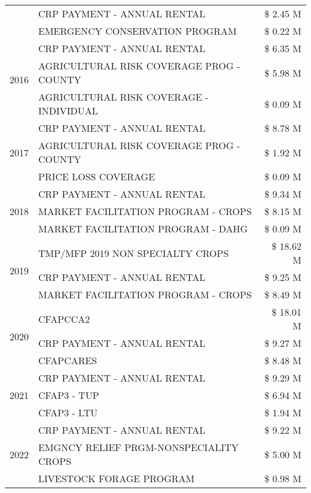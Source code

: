 \begin{tabular}{llr}
 & CRP PAYMENT - ANNUAL RENTAL & \$ 2.45 M \\
 & EMERGENCY CONSERVATION PROGRAM & \$ 0.22 M \\
\cline{1-3}
\multirow[t]{3}{*}{2016} & CRP PAYMENT - ANNUAL RENTAL & \$ 6.35 M \\
 & AGRICULTURAL RISK COVERAGE PROG - COUNTY & \$ 5.98 M \\
 & AGRICULTURAL RISK COVERAGE - INDIVIDUAL & \$ 0.09 M \\
\cline{1-3}
\multirow[t]{3}{*}{2017} & CRP PAYMENT - ANNUAL RENTAL & \$ 8.78 M \\
 & AGRICULTURAL RISK COVERAGE PROG - COUNTY & \$ 1.92 M \\
 & PRICE LOSS COVERAGE & \$ 0.09 M \\
\cline{1-3}
\multirow[t]{3}{*}{2018} & CRP PAYMENT - ANNUAL RENTAL & \$ 9.34 M \\
 & MARKET FACILITATION PROGRAM - CROPS & \$ 8.15 M \\
 & MARKET FACILITATION PROGRAM - DAHG & \$ 0.09 M \\
\cline{1-3}
\multirow[t]{3}{*}{2019} & TMP/MFP 2019 NON SPECIALTY CROPS & \$ 18.62 M \\
 & CRP PAYMENT - ANNUAL RENTAL & \$ 9.25 M \\
 & MARKET FACILITATION PROGRAM - CROPS & \$ 8.49 M \\
\cline{1-3}
\multirow[t]{3}{*}{2020} & CFAPCCA2 & \$ 18.01 M \\
 & CRP PAYMENT - ANNUAL RENTAL & \$ 9.27 M \\
 & CFAPCARES & \$ 8.48 M \\
\cline{1-3}
\multirow[t]{3}{*}{2021} & CRP PAYMENT - ANNUAL RENTAL & \$ 9.29 M \\
 & CFAP3 - TUP & \$ 6.94 M \\
 & CFAP3 - LTU & \$ 1.94 M \\
\cline{1-3}
\multirow[t]{3}{*}{2022} & CRP PAYMENT - ANNUAL RENTAL & \$ 9.22 M \\
 & EMGNCY RELIEF PRGM-NONSPECIALITY CROPS & \$ 5.00 M \\
 & LIVESTOCK FORAGE PROGRAM & \$ 0.98 M \\
\cline{1-3}
\bottomrule
\end{tabular}
